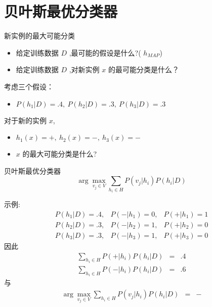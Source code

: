 \documentclass[presentation]{beamer}
\begin{document}
\section{贝叶斯最优分类器}
\label{sec:org2ecac76}
\begin{frame}[label={sec:orgc18c38a}]{新实例的最大可能分类}
\begin{itemize}
\item 给定训练数据 \(D\) ,最可能的假设是什么?( \(h_{MAP}\))
\item 给定训练数据 \(D\) ,对新实例 \(x\) 的最可能分类是什么？
\end{itemize}

考虑三个假设：
\begin{itemize}
\item \(P(h_{1}|D)=.4, \  P(h_{2}|D)=.3, \  P(h_{3}|D)=.3\)
\end{itemize}

对于新的实例 \(x\), 
\begin{itemize}
\item \(h_{1}(x)=+, \ h_{2}(x)=-, \ h_{3}(x)=-\)
\item \(x\) 的最大可能分类是什么?
\end{itemize}
\end{frame}

\begin{frame}[label={sec:org15d55bd}]{贝叶斯最优分类器}
$$\arg \max_{v_{j} \in V} \sum_{h_{i} \in H} P(v_{j}|h_{i}) P(h_{i}|D)$$
\end{frame}

\begin{frame}[label={sec:orgff4f2ac}]{示例:}
\begin{eqnarray}
P(h_{1}|D)=.4, & P(-|h_{1})=0, & P(+|h_{1})=1 \nonumber \\
P(h_{2}|D)=.3, & P(-|h_{2})=1, & P(+|h_{2})=0 \nonumber \\
P(h_{3}|D)=.3, & P(-|h_{3})=1, & P(+|h_{3})=0 \nonumber 
\end{eqnarray}
因此
\begin{eqnarray}
\sum_{h_{i} \in H} P(+|h_{i}) P(h_{i}|D) & = & .4 \nonumber \\
\sum_{h_{i} \in H} P(-|h_{i}) P(h_{i}|D) & = & .6 \nonumber
\end{eqnarray}
与
\begin{eqnarray}
\arg \max_{v_{j} \in V} \sum_{h_{i} \in H} P(v_{j}|h_{i}) P(h_{i}|D) & = & -
\nonumber 
\end{eqnarray}
\end{frame}
\end{document}
